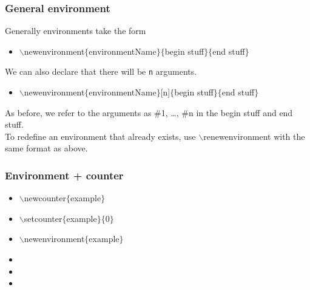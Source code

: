 \begin{frame}  \frametitle{General environment}
	Generally environments take the form
	\vspace{0.5mm} \\
	\begin{itemize}
		\item[] {\color{command}$\backslash$newenvironment\color{braces}$\{${\color{black}environmentName}$\}\{${\color{highlight}begin stuff}$\}\{${\color{highlight}end stuff}$\}$}
	\end{itemize}
	\vspace{0.5mm}
	We can also declare that there will be \texttt{n} arguments.
	\vspace{0.5mm} \\
	\begin{itemize}
		\item[] {\color{command}$\backslash$newenvironment\color{braces}$\{${\color{black}environmentName}$\}${\color{black}[n]}$\{${\color{highlight}begin stuff}$\}\{${\color{highlight}end stuff}$\}$}
	\end{itemize}
	\vspace{0.5mm}
	As before, we refer to the arguments as \#1, \dots, \#n in the {\color{highlight}begin stuff} and {\color{highlight}end stuff}.
	\vspace{7mm} \\
	To redefine an environment that already exists, use {\color{command}$\backslash$renewenvironment} with the same format as above.
\end{frame}

\begin{frame}  \frametitle{Environment + counter}
	\begin{itemize}
		\item[] {\color{command}$\backslash$newcounter\color{braces}$\{${\color{black}example}$\}$}
		\item[] {\color{command}$\backslash$setcounter\color{braces}$\{${\color{black}example}$\}$$\{${\color{black}0}$\}$}
		\item[] {\color{command}$\backslash$newenvironment\color{braces}$\{${\color{black}example}$\}$}
		\item[] 
		\item[] 
		\item[] \hspace{4mm}{\color{braces}$\{${\color{command}$\backslash\backslash$}$\}$}
	\end{itemize}
\end{frame}


